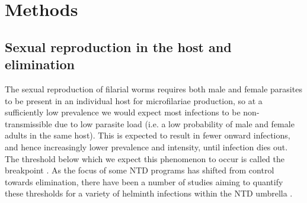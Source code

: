 \section{Methods}

\subsection[Elimination theory]{Sexual reproduction in the host and elimination}

The sexual reproduction of filarial worms requires both male and female parasites to be present in an individual host for microfilariae production, so at a sufficiently low prevalence we would expect most infections to be non-transmissible due to low parasite load (i.e. a low probability of male and female adults in the same host). This is expected to result in fewer onward infections, and hence increasingly lower prevalence and intensity, until infection dies out. The threshold below which we expect this phenomenon to occur is called the breakpoint \cite{Anderson1992,Anderson2017}. As the focus of some NTD programs has shifted from control towards elimination, there have been a number of studies aiming to quantify these thresholds for a variety of helminth infections within the NTD umbrella \cite{Truscott2017,Irvine2018,Klepac2015,Hollingsworth2015}.

